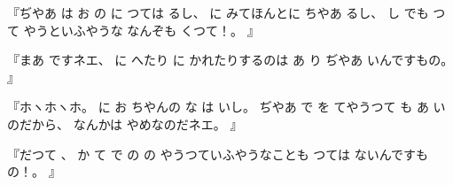 『ぢやあ
は
お
の
に
つては
るし、
に
みてほんとに
ちやあ
るし、
し
でも
つて
やうといふやうな
なんぞも
くつて！。
』

『まあ
ですネエ、
に
へたり
に
かれたりするのは
あ
り
ぢやあ
いんですもの。
』

『ホヽホヽホ。
に
お
ちやんの
な
は
いし。
ぢやあ
で
を
てやうつて
も
あ
いのだから、
なんかは
やめなのだネエ。
』

『だつて
、
か
て
で
の
の
やうつていふやうなことも
つては
ないんですもの！。
』

